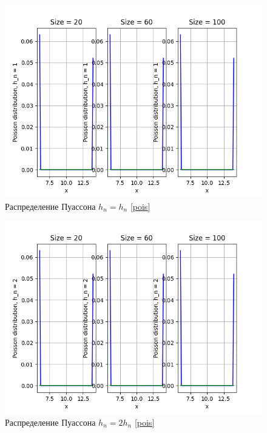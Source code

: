 \documentclass[a4paper]{article}
\begin{document}
        \begin{figure}[H]
            \centering
            \includegraphics[scale = 0.4]{Poisson distribution, h_n = 1.png}
            \caption{Распределение Пуассона $h_n = h_n$ \eqref{pois}}
            \label{fig:cauchy}
        \end{figure}
        
        \begin{figure}[H]
            \centering
            \includegraphics[scale = 0.4]{Poisson distribution, h_n = 2.png}
            \caption{Распределение Пуассона $h_n = 2 h_n$ \eqref{pois}}
            \label{fig:cauchy}
        \end{figure}
        
\end{document}
